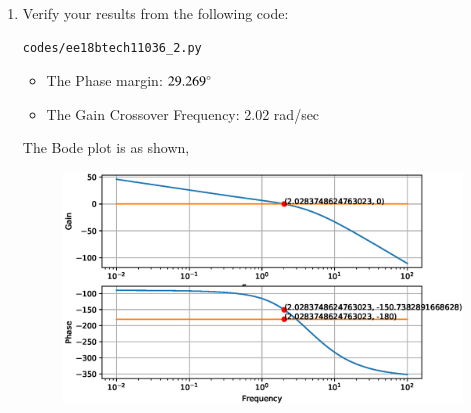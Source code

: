 \begin{enumerate}[label=\thesection.\arabic*.,ref=\thesection.\theenumi]
\begin{figure}[!ht]
    \centering
	\resizebox{\columnwidth}{!}{}
\caption{}
\label{fig:ee18btech11036_fin}
\end{figure}


\item
Verify your results from the following code:
\begin{lstlisting}
codes/ee18btech11036_2.py
\end{lstlisting}
\begin{itemize}
    \item The Phase margin: $29.269\degree$
    \item The Gain Crossover Frequency: 2.02 rad/sec
\end{itemize}
%
The Bode plot is as shown,
\begin{figure}[!h]
  \centering
  \includegraphics[width=\columnwidth]{./figs/ee18btech11036_2.eps}
  \caption{}
  \label{fig:ee18btech11036_2}
\end{figure}


\end{enumerate}
